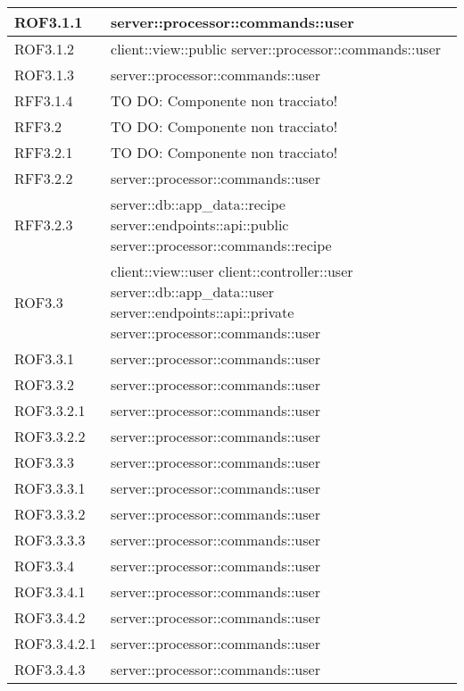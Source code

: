 \begin{center}
\begin{longtable}{| p{4cm} | p{8cm} |}
\hline
ROF3.1.1 & server::processor::commands::user \\
\hline
ROF3.1.2 & client::view::public \newline server::processor::commands::user \\
\hline
ROF3.1.3 & server::processor::commands::user \\
\hline
RFF3.1.4 & TO DO: Componente non tracciato! \\
\hline
RFF3.2 & TO DO: Componente non tracciato! \\
\hline
RFF3.2.1 & TO DO: Componente non tracciato! \\
\hline
RFF3.2.2 & server::processor::commands::user \\
\hline
RFF3.2.3 & server::db::app\_data::recipe \newline server::endpoints::api::public \newline server::processor::commands::recipe \\
\hline
ROF3.3 & client::view::user \newline client::controller::user \newline server::db::app\_data::user \newline server::endpoints::api::private \newline server::processor::commands::user \\
\hline
ROF3.3.1 & server::processor::commands::user \\
\hline
ROF3.3.2 & server::processor::commands::user \\
\hline
ROF3.3.2.1 & server::processor::commands::user \\
\hline
ROF3.3.2.2 & server::processor::commands::user \\
\hline
ROF3.3.3 & server::processor::commands::user \\
\hline
ROF3.3.3.1 & server::processor::commands::user \\
\hline
ROF3.3.3.2 & server::processor::commands::user \\
\hline
ROF3.3.3.3 & server::processor::commands::user \\
\hline
ROF3.3.4 & server::processor::commands::user \\
\hline
ROF3.3.4.1 & server::processor::commands::user \\
\hline
ROF3.3.4.2 & server::processor::commands::user \\
\hline
ROF3.3.4.2.1 & server::processor::commands::user \\
\hline
ROF3.3.4.3 & server::processor::commands::user \\

\end{longtable}
\end{center}
